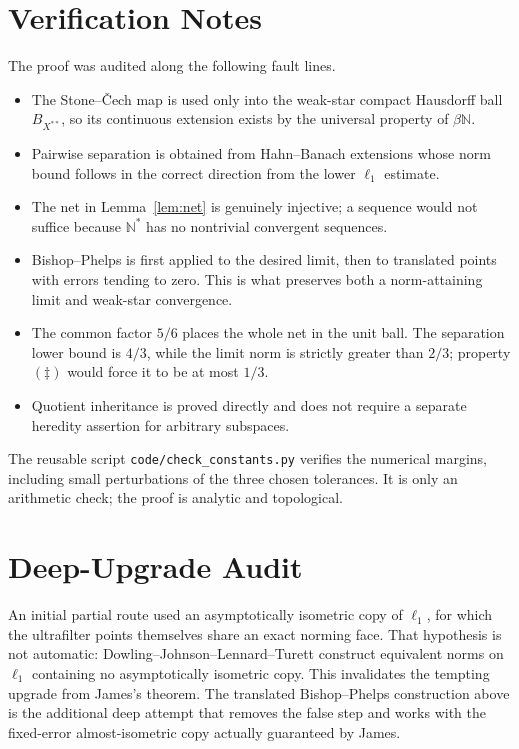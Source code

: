 \documentclass[11pt]{article}
\newcommand{\N}{\mathbb N}
\begin{document}
\section*{Verification Notes}

The proof was audited along the following fault lines.

\begin{itemize}
\item The Stone--\v Cech map is used only into the weak-star compact Hausdorff
ball \(B_{X^{**}}\), so its continuous extension exists by the universal
property of \(\beta\N\).
\item Pairwise separation is obtained from Hahn--Banach extensions whose norm
bound follows in the correct direction from the lower \(\ell_1\) estimate.
\item The net in Lemma~\ref{lem:net} is genuinely injective; a sequence would
not suffice because \(\N^*\) has no nontrivial convergent sequences.
\item Bishop--Phelps is first applied to the desired limit, then to translated
points with errors tending to zero.  This is what preserves both a
norm-attaining limit and weak-star convergence.
\item The common factor \(5/6\) places the whole net in the unit ball.  The
separation lower bound is \(4/3\), while the limit norm is strictly greater
than \(2/3\); property \((\ddagger)\) would force it to be at most \(1/3\).
\item Quotient inheritance is proved directly and does not require a separate
heredity assertion for arbitrary subspaces.
\end{itemize}

The reusable script \texttt{code/check\_constants.py} verifies the numerical
margins, including small perturbations of the three chosen tolerances.  It is
only an arithmetic check; the proof is analytic and topological.

\section*{Deep-Upgrade Audit}

An initial partial route used an asymptotically isometric copy of \(\ell_1\),
for which the ultrafilter points themselves share an exact norming face.
That hypothesis is not automatic: Dowling--Johnson--Lennard--Turett
\cite{DowlingEtAl} construct equivalent norms on \(\ell_1\) containing no
asymptotically isometric copy.  This invalidates the tempting upgrade from
James's theorem.  The translated Bishop--Phelps construction above is the
additional deep attempt that removes the false step and works with the
fixed-error almost-isometric copy actually guaranteed by James.
\end{document}
